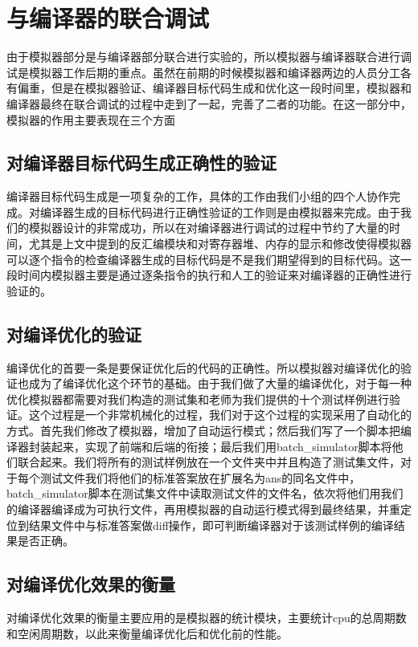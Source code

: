 \documentclass[12pt,a4paper]{article}
\begin{document}
\section{与编译器的联合调试}
由于模拟器部分是与编译器部分联合进行实验的，所以模拟器与编译器联合进行调试是模拟器工作后期的重点。虽然在前期的时候模拟器和编译器两边的人员分工各有偏重，但是在模拟器验证、编译器目标代码生成和优化这一段时间里，模拟器和编译器最终在联合调试的过程中走到了一起，完善了二者的功能。在这一部分中，模拟器的作用主要表现在三个方面

\subsection{对编译器目标代码生成正确性的验证}
编译器目标代码生成是一项复杂的工作，具体的工作由我们小组的四个人协作完成。对编译器生成的目标代码进行正确性验证的工作则是由模拟器来完成。由于我们的模拟器设计的非常成功，所以在对编译器进行调试的过程中节约了大量的时间，尤其是上文中提到的反汇编模块和对寄存器堆、内存的显示和修改使得模拟器可以逐个指令的检查编译器生成的目标代码是不是我们期望得到的目标代码。这一段时间内模拟器主要是通过逐条指令的执行和人工的验证来对编译器的正确性进行验证的。

\subsection{对编译优化的验证}
编译优化的首要一条是要保证优化后的代码的正确性。所以模拟器对编译优化的验证也成为了编译优化这个环节的基础。由于我们做了大量的编译优化，对于每一种优化模拟器都需要对我们构造的测试集和老师为我们提供的十个测试样例进行验证。这个过程是一个非常机械化的过程，我们对于这个过程的实现采用了自动化的方式。首先我们修改了模拟器，增加了自动运行模式；然后我们写了一个脚本把编译器封装起来，实现了前端和后端的衔接；最后我们用batch\_simulator脚本将他们联合起来。我们将所有的测试样例放在一个文件夹中并且构造了测试集文件，对于每个测试文件我们将他们的标准答案放在扩展名为ans的同名文件中，batch\_simulator脚本在测试集文件中读取测试文件的文件名，依次将他们用我们的编译器编译成为可执行文件，再用模拟器的自动运行模式得到最终结果，并重定位到结果文件中与标准答案做diff操作，即可判断编译器对于该测试样例的编译结果是否正确。

\subsection{对编译优化效果的衡量}
对编译优化效果的衡量主要应用的是模拟器的统计模块，主要统计cpu的总周期数和空闲周期数，以此来衡量编译优化后和优化前的性能。
\end{document}
